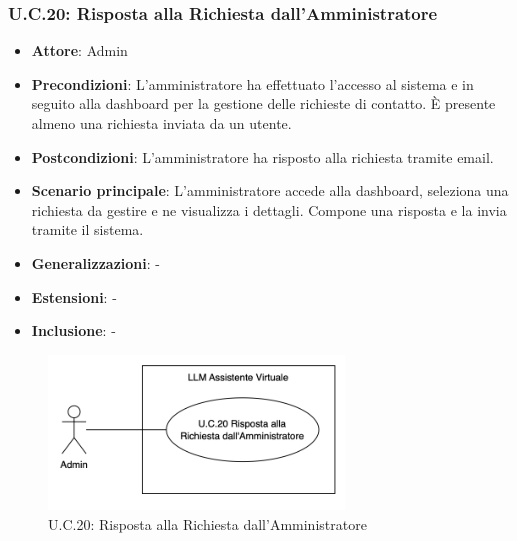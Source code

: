 \subsubsection{U.C.20: Risposta alla Richiesta dall’Amministratore} %
\begin{itemize}
    \item \textbf{Attore}: Admin
    \item \textbf{Precondizioni}: L’amministratore ha effettuato l’accesso al sistema e in seguito alla dashboard per la gestione delle richieste di contatto. È presente almeno una richiesta inviata da un utente.
    \item \textbf{Postcondizioni}: L’amministratore ha risposto alla richiesta tramite email.
    \item \textbf{Scenario principale}: L’amministratore accede alla dashboard, seleziona una richiesta da gestire e ne visualizza i dettagli. Compone una risposta e la invia tramite il sistema.
    \item \textbf{Generalizzazioni}: -
    \item \textbf{Estensioni}: -
    \item \textbf{Inclusione}: -
\end{itemize}
\begin{figure}[H]
    \centering
    \includegraphics[width=0.7\textwidth]{img/UC20.png}
    \caption{U.C.20: Risposta alla Richiesta dall’Amministratore}
\end{figure}
\newpage

